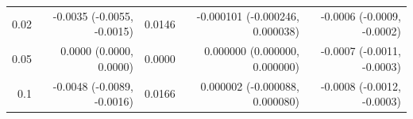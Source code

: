 \begin{tabular}{rrrrr}
0.02 & -0.0035 (-0.0055, -0.0015) & 0.0146 & -0.000101 (-0.000246, 0.000038) & -0.0006 (-0.0009, -0.0002) \\
0.05 & 0.0000 (0.0000, 0.0000) & 0.0000 & 0.000000 (0.000000, 0.000000) & -0.0007 (-0.0011, -0.0003) \\
0.1 & -0.0048 (-0.0089, -0.0016) & 0.0166 & 0.000002 (-0.000088, 0.000080) & -0.0008 (-0.0012, -0.0003) \\

\end{tabular}
